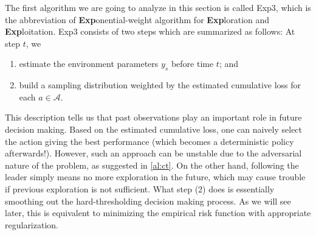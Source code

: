 \documentclass[10pt,a4article]{amsart}
\numberwithin{equation}{section}
\theoremstyle{plain}
\theoremstyle{definition}
\begin{document}
The first algorithm we are going to analyze in this section is called Exp3, which is the abbreviation of \textbf{Exp}onential-weight algorithm for \textbf{Exp}loration and \textbf{Exp}loitation. Exp3 consists of two steps which are summarized as follows: At step $t$, we
\begin{enumerate}
\item estimate the environment parameters $y_s$ before time $t$; and 
\item build a sampling distribution weighted by the estimated cumulative loss for each $a\in\mathcal A$. 
\end{enumerate}
This description tells us that past observations play an important role in future decision making. Based on the estimated cumulative loss, one can naively select the action giving the best performance (which becomes a deterministic policy afterwards!). However, such an approach can be unstable due to the adversarial nature of the problem, as suggested in \eqref{al:ct}. On the other hand, following the leader simply means no more exploration in the future, which may cause trouble if previous exploration is not sufficient. What step (2) does is essentially smoothing out the hard-thresholding decision making process. As we will see later, this is equivalent to minimizing the empirical risk function with appropriate regularization.  
\end{document}
